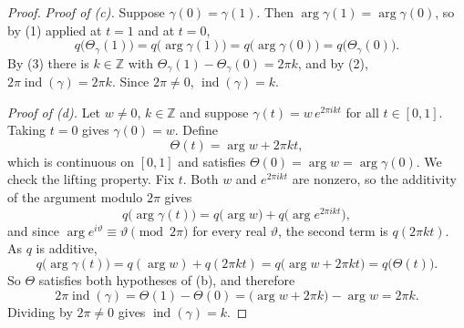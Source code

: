 \begin{proof}
\emph{Proof of (c).}  Suppose $\gamma(0)=\gamma(1)$.  Then
$\arg\gamma(1)=\arg\gamma(0)$, so by (1) applied at $t=1$ and at $t=0$,
\[
  q\bigl(\Theta_\gamma(1)\bigr)=q\bigl(\arg\gamma(1)\bigr)
  =q\bigl(\arg\gamma(0)\bigr)=q\bigl(\Theta_\gamma(0)\bigr).
\]
By (3) there is $k\in\mathbb{Z}$ with $\Theta_\gamma(1)-\Theta_\gamma(0)=2\pi k$,
and by (2), $2\pi\operatorname{ind}(\gamma)=2\pi k$.  Since $2\pi\neq0$,
$\operatorname{ind}(\gamma)=k$.

\emph{Proof of (d).}  Let $w\neq0$, $k\in\mathbb{Z}$ and suppose
$\gamma(t)=w\,e^{2\pi ikt}$ for all $t\in[0,1]$.  Taking $t=0$ gives
$\gamma(0)=w$.  Define
\[
  \Theta(t)=\arg w+2\pi kt ,
\]
which is continuous on $[0,1]$ and satisfies $\Theta(0)=\arg w=\arg\gamma(0)$.
We check the lifting property.  Fix $t$.  Both $w$ and $e^{2\pi ikt}$ are
nonzero, so the additivity of the argument modulo $2\pi$ gives
\[
  q\bigl(\arg\gamma(t)\bigr)=q\bigl(\arg w\bigr)+q\bigl(\arg e^{2\pi ikt}\bigr),
\]
and since $\arg e^{i\vartheta}\equiv\vartheta\pmod{2\pi}$ for every real
$\vartheta$, the second term is $q(2\pi kt)$.  As $q$ is additive,
\[
  q\bigl(\arg\gamma(t)\bigr)=q(\arg w)+q(2\pi kt)=q\bigl(\arg w+2\pi kt\bigr)=q\bigl(\Theta(t)\bigr).
\]
So $\Theta$ satisfies both hypotheses of (b), and therefore
\[
  2\pi\operatorname{ind}(\gamma)=\Theta(1)-\Theta(0)
  =\bigl(\arg w+2\pi k\bigr)-\arg w=2\pi k .
\]
Dividing by $2\pi\neq0$ gives $\operatorname{ind}(\gamma)=k$.
\end{proof}
